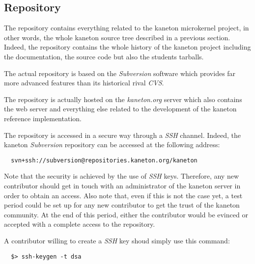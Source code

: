 %
%
%
%
%
%

%
%

\subsection{Repository}
\label{section:repository}

The repository contains everything related to the kaneton microkernel
project, in other words, the whole kaneton source tree described in a
previous section. Indeed, the repository contains the whole history
of the kaneton project including the documentation, the source code
but also the students tarballs.

The actual repository is based on the \textit{Subversion} software which
provides far more advanced features than its historical rival \textit{CVS}.

The repository is actually hosted on the \textit{kaneton.org} server which
also contains the web server and everything else related to the development
of the kaneton reference implementation.

The repository is accessed in a secure way through a \textit{SSH} channel.
Indeed, the kaneton \textit{Subversion} repository can be accessed at the
following address:

\begin{verbatim}
  svn+ssh://subversion@repositories.kaneton.org/kaneton
\end{verbatim}

Note that the security is achieved by the use of \textit{SSH} keys. Therefore,
any new contributor should get in touch with an administrator of the
kaneton server in order to obtain an access. Also note that, even if this is
not the case yet, a test period could be set up for any new contributor
to get the trust of the kaneton community. At the end of this period,
either the contributor would be evinced or accepted with a complete access to
the repository.

A contributor willing to create a \textit{SSH} key shoud simply use this
command:

\begin{verbatim}
  $> ssh-keygen -t dsa
\end{verbatim}

